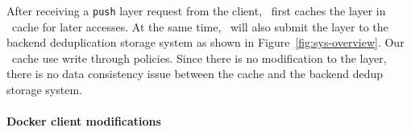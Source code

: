 After receiving a \texttt{push} layer request from the client, 
\sysname~first caches the layer in \sysname~cache for later accesses.
At the same time, 
\sysname~will also submit the layer to the backend deduplication storage system as shown in Figure~\ref{fig:sys-overview}.
Our \sysname~cache use write through policies. 
Since there is no modification to the layer, 
there is no data consistency issue between the cache and the backend dedup storage system.

\paragraph{Docker client modifications}

 
